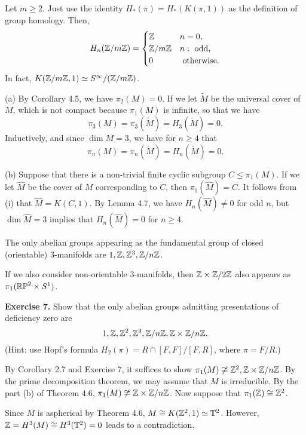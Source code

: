 \documentclass{../../../small}
\begin{document}
\begin{lem}
Let $m\ge2$.
Just use the identity $H_*(\pi)=H_*(K(\pi,1))$ as the definition of group homology.
Then,
\[H_n(\mathbb{Z}/m\mathbb{Z})=\begin{cases}\mathbb{Z}&n=0,\\\mathbb{Z}/m\mathbb{Z}&n:\text{ odd,}\\0&\text{ otherwise.}\end{cases}\]
In fact, $K(\mathbb{Z}/m\mathbb{Z},1)\simeq S^\infty/(\mathbb{Z}/m\mathbb{Z})$.
\end{lem}
\begin{pf}
(a)
By Corollary 4.5, we have $\pi_2(M)=0$.
If we let $\tilde M$ be the universal cover of $M$, which is not compact because $\pi_1(M)$ is infinite, so that we have
\[\pi_3(M)=\pi_3(\tilde M)=H_3(\tilde M)=0.\]
Inductively, and since $\dim M=3$, we have for $n\ge4$ that
\[\pi_n(M)=\pi_n(\tilde M)=H_n(\tilde M)=0.\]

(b)
Suppose that there is a non-trivial finite cyclic subgroup $C\le\pi_1(M)$.
If we let $\hat M$ be the cover of $M$ corresponding to $C$, then $\pi_1(\hat M)=C$.
It follows from (i) that $\hat M=K(C,1)$.
By Lemma 4.7, we have $H_n(\hat M)\ne0$ for odd $n$, but $\dim\hat M=3$ implies that $H_n(\hat M)=0$ for $n\ge4$.
\end{pf}
\begin{thm}
The only abelian groups appearing as the fundamental group of closed (orientable) 3-manifolds are $1,\mathbb{Z},\mathbb{Z}^3,\mathbb{Z}/n\mathbb{Z}$.
\end{thm}
\begin{rmk*}
If we also consider non-orientable 3-manifolds, then $\mathbb{Z}\times\mathbb{Z}/2\mathbb{Z}$ also appears as $\pi_1(\mathbb{RP}^2\times S^1)$.
\end{rmk*}

\noindent\textbf{Exercise 7.}
Show that the only abelian groups admitting presentations of deficiency zero are
\[1,\mathbb{Z},\mathbb{Z}^2,\mathbb{Z}^3,\mathbb{Z}/n\mathbb{Z},\mathbb{Z}\times\mathbb{Z}/n\mathbb{Z}.\]
(Hint: use Hopf's formula $H_2(\pi)=R\cap[F,F]/[F,R]$, where $\pi=F/R$.)


\begin{pf}
By Corollary 2.7 and Exercise 7, it suffices to show $\pi_1(M)\not\cong\mathbb{Z}^2,\mathbb{Z}\times\mathbb{Z}/n\mathbb{Z}$.
By the prime decomposition theorem, we may assume that $M$ is irreducible.
By the part (b) of Theorem 4.6, $\pi_1(M)\not\cong\mathbb{Z}\times\mathbb{Z}/n\mathbb{Z}$.
Now suppose that $\pi_1(\mathbb{Z})\cong\mathbb{Z}^2$.

Since $M$ is aspherical by Theorem 4.6, $M\cong K(\mathbb{Z}^2,1)\simeq\mathbb{T}^2$.
However, $\mathbb{Z}=H^3(M)\cong H^3(\mathbb{T}^2)=0$ leads to a contradiction.
\end{pf}
\end{document}
